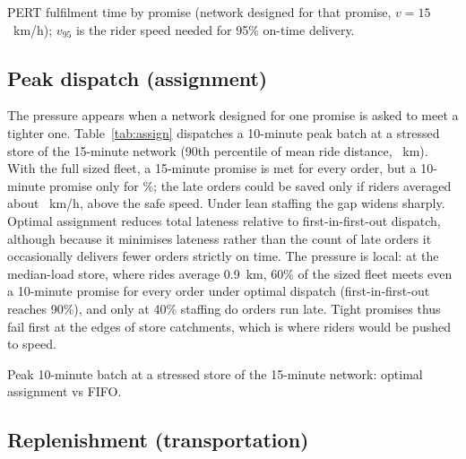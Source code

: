 \begin{table}[ht]
\centering\small
\caption{PERT fulfilment time by promise (network designed for that promise, $v=15$~km/h); $v_{95}$ is the rider speed needed for 95\% on-time delivery.}\label{tab:pert}
\begin{adjustbox}{max width=\linewidth}\end{adjustbox}
\end{table}

\subsection{Peak dispatch (assignment)}

The pressure appears when a network designed for one promise is asked to meet a tighter one. Table~\ref{tab:assign} dispatches a 10-minute peak batch at a stressed store of the 15-minute network (90th percentile of mean ride distance, \AssignStressRide~km). With the full sized fleet, a 15-minute promise is met for every order, but a 10-minute promise only for \AssignStressTenOnTime\%; the late orders could be saved only if riders averaged about \AssignStressSpeed~km/h, above the safe speed. Under lean staffing the gap widens sharply. Optimal assignment reduces total lateness relative to first-in-first-out dispatch, although because it minimises lateness rather than the count of late orders it occasionally delivers fewer orders strictly on time. The pressure is local: at the median-load store, where rides average 0.9~km, 60\% of the sized fleet meets even a 10-minute promise for every order under optimal dispatch (first-in-first-out reaches 90\%), and only at 40\% staffing do orders run late. Tight promises thus fail first at the edges of store catchments, which is where riders would be pushed to speed.

\begin{table}[t]
\centering\small
\caption{Peak 10-minute batch at a stressed store of the 15-minute network: optimal assignment vs FIFO.}\label{tab:assign}
\begin{adjustbox}{max width=\linewidth}\end{adjustbox}
\end{table}

\subsection{Replenishment (transportation)}

